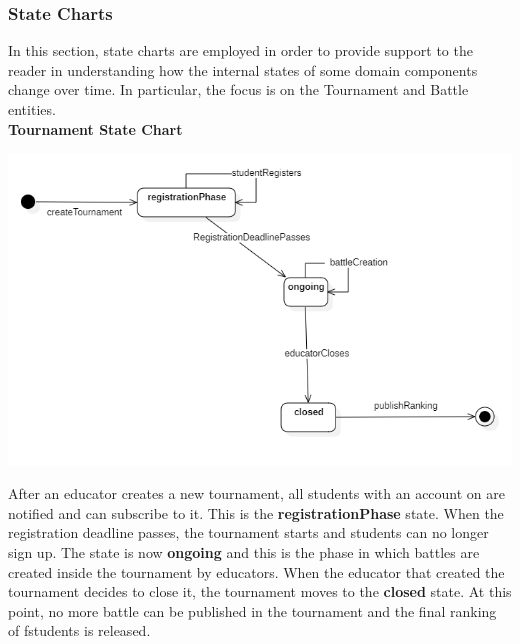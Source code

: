 \subsubsection{State Charts}
In this section, state charts are employed in order to provide support to the reader in understanding how the internal states of some domain components change over time. In particular, the focus is on the Tournament and Battle entities.\\[0.7cm]

\textbf{Tournament State Chart}

   \begin{center}
    \includegraphics[width=1\textwidth]{2Overall_Description/res/StateChartTournament}
    \end{center}

After an educator creates a new tournament, all students with an account on \app are notified and can subscribe to it. This is the \textbf{registrationPhase} state. When the registration deadline passes, the tournament starts and students can no longer sign up. The state is now \textbf{ongoing} and this is the phase in which battles are created inside the tournament by educators. When the educator that created the tournament decides to close it, the tournament moves to the \textbf{closed} state. At this point, no more battle can be published in the tournament and the final ranking of fstudents is released.\\

